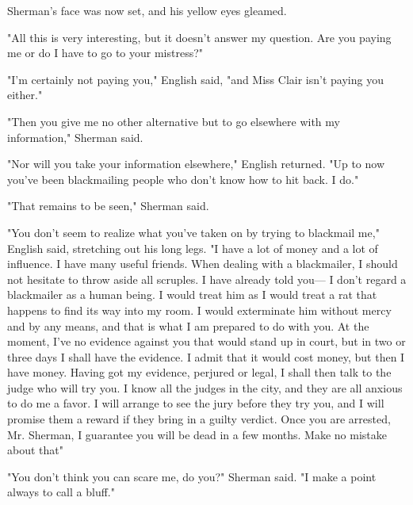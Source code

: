 \documentclass{novel}
\begin{document}
Sherman's face was now set, and his yellow eyes gleamed.

"All this is very interesting, but it doesn't answer my question. Are you paying me or do I have to go to your mistress?"

"I'm certainly not paying you," English said, "and Miss Clair isn't paying you either."

"Then you give me no other alternative but to go elsewhere with my information," Sherman said.

"Nor will you take your information elsewhere," English returned. "Up to now you've been blackmailing people who don't know how to hit back. I do."

"That remains to be seen," Sherman said.

"You don't seem to realize what you've taken on by trying to blackmail me," English said, stretching out his long legs. "I have a lot of money and a lot of influence. I have many useful friends. When dealing with a blackmailer, I should not hesitate to throw aside all scruples. I have already told you— I don't regard a blackmailer as a human being. I would treat him as I would treat a rat that happens to find its way into my room. I would exterminate him without mercy and by any means, and that is what I am prepared to do with you. At the moment, I've no evidence against you that would stand up in court, but in two or three days I shall have the evidence. I admit that it would cost money, but then I have money. Having got my evidence, perjured or legal, I shall then talk to the judge who will try you. I know all the judges in the city, and they are all anxious to do me a favor. I will arrange to see the jury before they try you, and I will promise them a reward if they bring in a guilty verdict. Once you are arrested, Mr. Sherman, I guarantee you will be dead in a few months. Make no mistake about that"

"You don't think you can scare me, do you?" Sherman said. "I make a point always to call a bluff."
\end{document}
